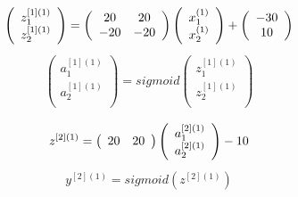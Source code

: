 \documentclass[a4paper]{article}
\begin{document}
\begin{align*}
\left( \begin{array} {c }
z_1^{[1](1)}  \\
z_2^{[1](1)}  \\
\end{array} \right)
=\left( \begin{array} {c c}
 20 & 20 \\
 -20 & -20 \\
\end{array} \right)
\left( \begin{array} {c}
x_1^{(1)}  \\
x_2^{(1)}  \\
\end{array} \right)
+
\left( \begin{array} {c}
-30  \\
10  \\
\end{array} \right)
\end{align*}
\begin{align*}
\left( \begin{array} {c }
a_1^{[1](1)}  \\
a_2^{[1](1)}  \\
\end{array} \right)
=sigmoid \left( \begin{array} {c }
z_1^{[1](1)}  \\
z_2^{[1](1)}  \\
\end{array} \right)
\end{align*}

\begin{align*}
z^{[2](1)}  
=\left( \begin{array} {c c}
 20 & 20 \\
\end{array} \right)
\left( \begin{array} {c}
a_1^{[2](1)}  \\
a_2^{[2](1)}  \\
\end{array} \right)
-10  \\
\end{align*}
\begin{align*}
y^{[2](1)}  
=sigmoid ( z^{[2](1)}  )
\end{align*}
\end{document}
